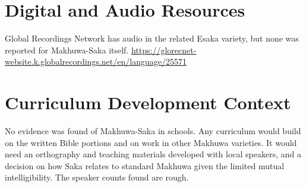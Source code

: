 \documentclass[12pt]{article}
\begin{document}
\section{Digital and Audio Resources}
Global Recordings Network has audio in the related Esaka variety, but none was reported for Makhuwa-Saka itself. \url{https://glorecnet-website.k.globalrecordings.net/en/language/25571}

\section{Curriculum Development Context}
No evidence was found of Makhuwa-Saka in schools. Any curriculum would build on the written Bible portions and on work in other Makhuwa varieties. It would need an orthography and teaching materials developed with local speakers, and a decision on how Saka relates to standard Makhuwa given the limited mutual intelligibility. The speaker counts found are rough.
\end{document}
